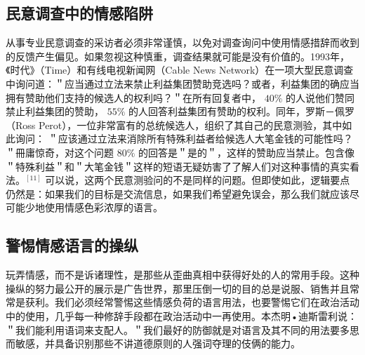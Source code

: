 \subsection{民意调查中的情感陷阱}

从事专业民意调查的采访者必须非常谨慎，以免对调查询问中使用情感措辞而收到的反馈产生偏见。如果忽视这种慎重，调查结果就可能是没有价值的。1993年，《时代》（Time）和有线电视新闻网（Cable News Network）在一项大型民意调查中询问道：＂应当通过立法来禁止利益集团赞助竞选吗？或者，利益集团的确应当拥有赞助他们支持的候选人的权利吗？＂在所有回复者中， $40 \%$ 的人说他们赞同禁止利益集团的赞助， $55 \%$ 的人回答利益集团有赞助的权利。同年，罗斯－佩罗（Ross Perot），一位非常富有的总统候选人，组织了其自己的民意测验，其中如此询问： ＂应该通过立法来消除所有特殊利益者给候选人大笔金钱的可能性吗？＂冊庸惊奇，对这个问题 $80 \%$ 的回答是＂是的＂，这样的赞助应当禁止。包含像＂特殊利益＂和＂大笔金钱＂这样的短语无疑妨害了了解人们对这种事情的真实看法。$^{[11]}$ 可以说，这两个民意测验问的不是同样的问题。但即使如此，逻辑要点仍然是：如果我们的目标是交流信息，如果我们希望避免误会，那么我们就应该尽可能少地使用情感色彩浓厚的语言。

\subsection{警惕情感语言的操纵}

玩弄情感，而不是诉诸理性，是那些从歪曲真相中获得好处的人的常用手段。这种操纵的努力最公开的展示是广告世界，那里压倒一切的目的总是说服、销售并且常常是获利。我们必须经常警惕这些情感负荷的语言用法，也要警惕它们在政治活动中的使用，几乎每一种修辞手段都在政治活动中一再使用。本杰明•迪斯雷利说：＂我们能利用语词来支配人。＂我们最好的防御就是对语言及其不同的用法要多思而敏感，并具备识别那些不讲道德原则的人强词夺理的伎俩的能力。

\begin{center}
\end{center} 